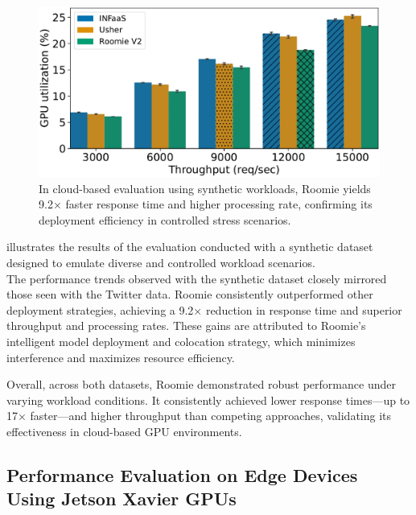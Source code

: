 \begin{figure}
\begin{minipage}[t]{.24\linewidth}
	\end{minipage}
	\hfill
	\begin{minipage}[t]{.24\linewidth}
		\centering
		\includegraphics[width=\linewidth]{chapters/roomie/images/NvidiaA100/synthetic-all-models/gpu_utilization.pdf}
	\end{minipage}
	\caption{In cloud-based evaluation using synthetic workloads, Roomie yields 9.2× faster response time and higher processing rate, confirming its deployment efficiency in controlled stress scenarios.}
	\label{fig:NvidiaA100/synthetic-all-models}
	\vspace{-3mm}
\end{figure}


 illustrates the results of the evaluation conducted with a synthetic dataset designed to emulate diverse and controlled workload scenarios.\\
The performance trends observed with the synthetic dataset closely mirrored those seen with the Twitter data. Roomie consistently outperformed other deployment strategies, achieving a 9.2× reduction in response time and superior throughput and processing rates. These gains are attributed to Roomie's intelligent model deployment and colocation strategy, which minimizes interference and maximizes resource efficiency.

Overall, across both datasets, Roomie demonstrated robust performance under varying workload conditions. It consistently achieved lower response times—up to 17× faster—and higher throughput than competing approaches, validating its effectiveness in cloud-based GPU environments.



\subsection{Performance Evaluation on Edge Devices Using Jetson Xavier GPUs}

